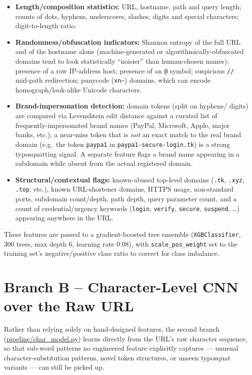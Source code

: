 \documentclass[11pt,a4paper]{report}
\begin{document}
\begin{itemize}[leftmargin=1.4em]
  \item \textbf{Length/composition statistics:} URL, hostname, path and query
  length; counts of dots, hyphens, underscores, slashes, digits and special
  characters; digit-to-length ratio.
  \item \textbf{Randomness/obfuscation indicators:} Shannon entropy of the full URL
  and of the hostname alone (machine-generated or algorithmically-obfuscated domains
  tend to look statistically ``noisier'' than human-chosen names); presence of a raw
  IP-address host; presence of an \texttt{@} symbol; suspicious \texttt{//}
  mid-path redirection; punycode (\texttt{xn--}) domains, which can encode
  homograph/look-alike Unicode characters.
  \item \textbf{Brand-impersonation detection:} domain tokens (split on hyphens/
  digits) are compared via Levenshtein edit distance against a curated list of
  frequently-impersonated brand names (PayPal, Microsoft, Apple, major banks, etc.);
  a near-miss token that is \emph{not} an exact match to the real brand domain (e.g.\
  the token \texttt{paypa1} in \texttt{paypa1-secure-login.tk}) is a strong
  typosquatting signal. A separate feature flags a brand name appearing in a
  subdomain while absent from the actual registered domain.
  \item \textbf{Structural/contextual flags:} known-abused top-level domains
  (\texttt{.tk}, \texttt{.xyz}, \texttt{.top}, etc.), known URL-shortener domains,
  HTTPS usage, non-standard ports, subdomain count/depth, path depth, query
  parameter count, and a count of credential/urgency keywords
  (\texttt{login}, \texttt{verify}, \texttt{secure}, \texttt{suspend}, \ldots)
  appearing anywhere in the URL.
\end{itemize}

These features are passed to a gradient-boosted tree ensemble (\texttt{XGBClassifier},
300 trees, max depth 6, learning rate 0.08), with \texttt{scale\_pos\_weight} set to
the training set's negative/positive class ratio to correct for class imbalance.

\section{Branch B -- Character-Level CNN over the Raw URL}
Rather than relying solely on hand-designed features, the second branch
(\url{pipeline/char_model.py}) learns directly from the URL's raw character
sequence, so that sub-word patterns no engineered feature explicitly captures ---
unusual character-substitution patterns, novel token structures, or unseen
typosquat variants --- can still be picked up.
\end{document}
